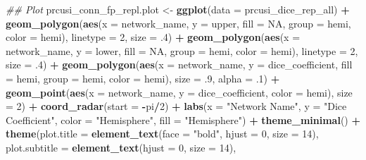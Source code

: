 \documentclass[
]{article}
\newenvironment{Shaded}{\begin{snugshade}}{\end{snugshade}}
\newcommand{\CommentTok}[1]{\textcolor[rgb]{0.56,0.35,0.01}{\textit{#1}}}
\newcommand{\DataTypeTok}[1]{\textcolor[rgb]{0.13,0.29,0.53}{#1}}
\newcommand{\DecValTok}[1]{\textcolor[rgb]{0.00,0.00,0.81}{#1}}
\newcommand{\FloatTok}[1]{\textcolor[rgb]{0.00,0.00,0.81}{#1}}
\newcommand{\KeywordTok}[1]{\textcolor[rgb]{0.13,0.29,0.53}{\textbf{#1}}}
\newcommand{\NormalTok}[1]{#1}
\newcommand{\OperatorTok}[1]{\textcolor[rgb]{0.81,0.36,0.00}{\textbf{#1}}}
\newcommand{\OtherTok}[1]{\textcolor[rgb]{0.56,0.35,0.01}{#1}}
\newcommand{\StringTok}[1]{\textcolor[rgb]{0.31,0.60,0.02}{#1}}
\begin{document}
\begin{Shaded}
\begin{Highlighting}[]
{{\CommentTok{## Plot}
\NormalTok{prcusi_conn_fp_repl.plot <-}\StringTok{ }\KeywordTok{ggplot}\NormalTok{(}\DataTypeTok{data =}\NormalTok{ prcusi_dice_rep_all) }\OperatorTok{+}\StringTok{  }
\StringTok{  }\KeywordTok{geom_polygon}\NormalTok{(}\KeywordTok{aes}\NormalTok{(}\DataTypeTok{x =}\NormalTok{ network_name, }\DataTypeTok{y =}\NormalTok{ upper, }\DataTypeTok{fill =} \OtherTok{NA}\NormalTok{, }\DataTypeTok{group =}\NormalTok{ hemi, }\DataTypeTok{color =}\NormalTok{ hemi), }
               \DataTypeTok{linetype =} \DecValTok{2}\NormalTok{, }\DataTypeTok{size =} \FloatTok{.4}\NormalTok{) }\OperatorTok{+}\StringTok{ }
\StringTok{  }\KeywordTok{geom_polygon}\NormalTok{(}\KeywordTok{aes}\NormalTok{(}\DataTypeTok{x =}\NormalTok{ network_name, }\DataTypeTok{y =}\NormalTok{ lower, }\DataTypeTok{fill =} \OtherTok{NA}\NormalTok{, }\DataTypeTok{group =}\NormalTok{ hemi, }\DataTypeTok{color =}\NormalTok{ hemi), }
               \DataTypeTok{linetype =} \DecValTok{2}\NormalTok{, }\DataTypeTok{size =} \FloatTok{.4}\NormalTok{) }\OperatorTok{+}
\StringTok{  }\KeywordTok{geom_polygon}\NormalTok{(}\KeywordTok{aes}\NormalTok{(}\DataTypeTok{x =}\NormalTok{ network_name, }\DataTypeTok{y =}\NormalTok{ dice_coefficient, }\DataTypeTok{fill =}\NormalTok{ hemi, }\DataTypeTok{group =}\NormalTok{ hemi, }\DataTypeTok{color =}\NormalTok{ hemi), }
               \DataTypeTok{size =} \FloatTok{.9}\NormalTok{, }\DataTypeTok{alpha =} \FloatTok{.1}\NormalTok{) }\OperatorTok{+}
\StringTok{  }\KeywordTok{geom_point}\NormalTok{(}\KeywordTok{aes}\NormalTok{(}\DataTypeTok{x =}\NormalTok{ network_name, }\DataTypeTok{y =}\NormalTok{ dice_coefficient, }\DataTypeTok{color =}\NormalTok{ hemi), }\DataTypeTok{size =} \DecValTok{2}\NormalTok{) }\OperatorTok{+}\StringTok{ }
\StringTok{  }\KeywordTok{coord_radar}\NormalTok{(}\DataTypeTok{start =} \OperatorTok{-}\NormalTok{pi}\OperatorTok{/}\DecValTok{2}\NormalTok{) }\OperatorTok{+}
\StringTok{  }\KeywordTok{labs}\NormalTok{(}\DataTypeTok{x =} \StringTok{"Network Name"}\NormalTok{,}
       \DataTypeTok{y =} \StringTok{"Dice Coefficient"}\NormalTok{, }
       \DataTypeTok{color =} \StringTok{"Hemisphere"}\NormalTok{,}
       \DataTypeTok{fill =} \StringTok{"Hemisphere"}\NormalTok{) }\OperatorTok{+}\StringTok{  }
\StringTok{  }\KeywordTok{theme_minimal}\NormalTok{() }\OperatorTok{+}
\StringTok{   }\KeywordTok{theme}\NormalTok{(}\DataTypeTok{plot.title =} \KeywordTok{element_text}\NormalTok{(}\DataTypeTok{face =} \StringTok{"bold"}\NormalTok{, }\DataTypeTok{hjust =} \DecValTok{0}\NormalTok{, }\DataTypeTok{size =} \DecValTok{14}\NormalTok{), }
        \DataTypeTok{plot.subtitle =} \KeywordTok{element_text}\NormalTok{(}\DataTypeTok{hjust =} \DecValTok{0}\NormalTok{, }\DataTypeTok{size =} \DecValTok{14}\NormalTok{),}
}}
\end{Highlighting}
\end{Shaded}
\end{document}
